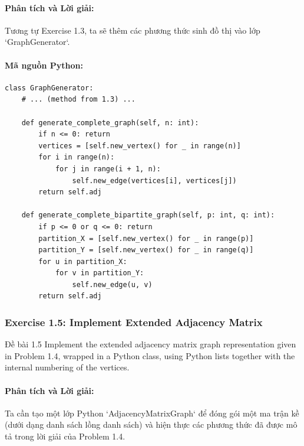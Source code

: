 \documentclass[a4paper,12pt]{article}
\begin{document}
\paragraph{Phân tích và Lời giải:}
Tương tự Exercise 1.3, ta sẽ thêm các phương thức sinh đồ thị vào lớp `GraphGenerator`.

\paragraph{Mã nguồn Python:}
\begin{lstlisting}[style=pythonstyle, caption={Sinh đồ thị đầy đủ và hai phía đầy đủ.}]
class GraphGenerator:
    # ... (method from 1.3) ...

    def generate_complete_graph(self, n: int):
        if n <= 0: return
        vertices = [self.new_vertex() for _ in range(n)]
        for i in range(n):
            for j in range(i + 1, n):
                self.new_edge(vertices[i], vertices[j])
        return self.adj

    def generate_complete_bipartite_graph(self, p: int, q: int):
        if p <= 0 or q <= 0: return
        partition_X = [self.new_vertex() for _ in range(p)]
        partition_Y = [self.new_vertex() for _ in range(q)]
        for u in partition_X:
            for v in partition_Y:
                self.new_edge(u, v)
        return self.adj
\end{lstlisting}

\subsubsection{Exercise 1.5: Implement Extended Adjacency Matrix}
\begin{problembox}{Đề bài 1.5}
    Implement the extended adjacency matrix graph representation given in Problem 1.4, wrapped in a Python class, using Python lists together with the internal numbering of the vertices.
\end{problembox}

\paragraph{Phân tích và Lời giải:}
Ta cần tạo một lớp Python `AdjacencyMatrixGraph` để đóng gói một ma trận kề (dưới dạng danh sách lồng danh sách) và hiện thực các phương thức đã được mô tả trong lời giải của Problem 1.4.
\end{document}
